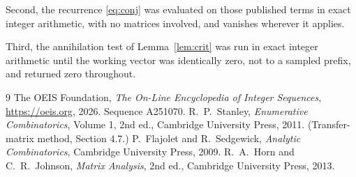 \documentclass[11pt,a4paper]{article}
\theoremstyle{plain}
\theoremstyle{definition}
\begin{document}
Second, the recurrence \eqref{eq:conj} was evaluated on those published terms in exact
integer arithmetic, with no matrices involved, and vanishes wherever it applies.

Third, the annihilation test of Lemma~\ref{lem:crit} was run in exact integer arithmetic
until the working vector was identically zero, not to a sampled prefix, and returned zero
throughout.

\begin{thebibliography}{9}
 The OEIS Foundation, \emph{The On-Line Encyclopedia of Integer
Sequences}, \url{https://oeis.org}, 2026. Sequence A251070.
 R.~P.~Stanley, \emph{Enumerative Combinatorics}, Volume 1, 2nd ed.,
Cambridge University Press, 2011. (Transfer-matrix method, Section 4.7.)
 P.~Flajolet and R.~Sedgewick, \emph{Analytic Combinatorics}, Cambridge
University Press, 2009.
 R.~A.~Horn and C.~R.~Johnson, \emph{Matrix Analysis}, 2nd ed., Cambridge
University Press, 2013.
\end{thebibliography}
\end{document}
